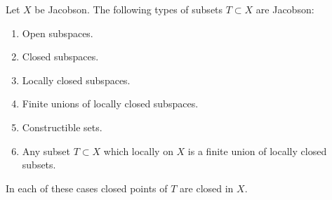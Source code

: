 \begin{lemma}
\label{lemma-jacobson-inherited}
Let $X$ be Jacobson. The following types of subsets $T \subset X$
are Jacobson:
\begin{enumerate}
\item Open subspaces.
\item Closed subspaces.
\item Locally closed subspaces.
\item Finite unions of locally closed subspaces.
\item Constructible sets.
\item Any subset $T \subset X$ which locally on $X$
is a finite union of locally closed subsets.
\end{enumerate}
In each of these cases closed points of $T$ are
closed in $X$.
\end{lemma}

